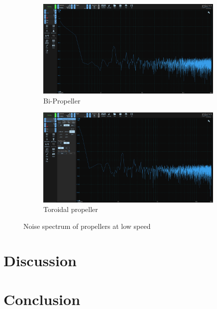 \documentclass[8pt]{article}
\begin{document}
\begin{figure}[H]
    \begin{subfigure}{0.99\textwidth}
        \centering
        \includegraphics[width=0.99\textwidth]{lospeed_biprop.png}
        \caption{Bi-Propeller}
        \label{fig:lospeed_biprop}
    \end{subfigure}
    \begin{subfigure}{0.99\textwidth}
        \centering
        \includegraphics[width=0.99\textwidth]{lospeed_toroid.png}
        \caption{Toroidal propeller}
        \label{fig:lospeed_toroid}
    \end{subfigure}
    \caption{Noise spectrum of propellers at low speed}
    \label{fig:noise_spectrum_lospeed}
\end{figure}

\section{Discussion}



\section{Conclusion}
\end{document}
